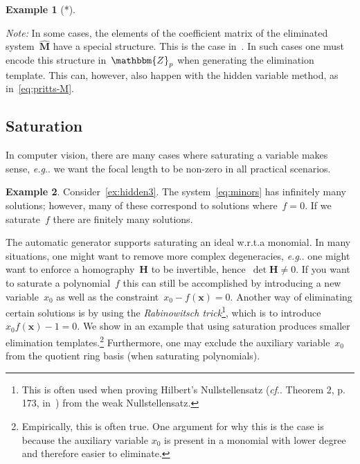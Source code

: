 \documentclass[11pt,a4paper]{article}
\makeatletter
\theoremstyle{definition}
\newtheorem{example}{Example}
\newcommand{\mat}[1]{\bm{#1}}
\newcommand{\Z}{\ensuremath{\mathbbm{Z}}}
\DeclareRobustCommand\eg{\emph{e.g}\@ifnextchar.{}{.\@}}
\DeclareRobustCommand\cf{\emph{cf}\@ifnextchar.{}{.\@}}
\makeatother
\begin{document}
\begin{example}[*]

\end{example}

\emph{Note:} In some cases, the elements of the coefficient matrix of the eliminated system~$\hat{\mat{M}}$ have a special structure.
This is the case in~\cite{kukelova-etal-cvpr-2015,valtonenoernhag-springer-2021}. In such cases
one must encode this structure in~$\Z_p$ when generating the elimination template.
This can, however, also happen with the hidden variable method, as in~\eqref{eq:pritts-M}.

\subsection{Saturation}
In computer vision, there are many cases where saturating a variable makes sense, \eg{}
we want the focal length to be non-zero in all practical scenarios.

\begin{example}
Consider~\cref{ex:hidden3}. The system~\eqref{eq:minors} has infinitely many solutions; however,
many of these correspond to solutions where~$f=0$. If we saturate~$f$ there are finitely many solutions.
\end{example}

The automatic generator supports saturating an ideal w.r.t.\@ a monomial. In many situations, one might
want to remove more complex degeneracies, \eg{} one might want to enforce a homography~$\mat{H}$
to be invertible, hence~$\det{\mat{H}}\neq 0$. If you want to saturate a polynomial~$f$ this
can still be accomplished by introducing a new
variable~$x_0$ as well as the constraint~$x_0-f(\mat{x}) = 0$.
Another way of eliminating certain solutions is by using the \emph{Rabinowitsch trick}\footnote{This
is often used when proving Hilbert's Nullstellensatz (\cf{} Theorem 2, p. 173, in~\cite{cox}) from the weak
Nullstellensatz.},
which is to introduce~$x_0f(\mat{x})-1 = 0$.
We show in an example that using saturation produces smaller elimination
templates.\footnote{Empirically, this is often true. One argument for why this is the case
is because the auxiliary variable $x_0$ is present in a monomial with lower degree and therefore easier to eliminate.}
Furthermore, one may exclude the auxiliary variable~$x_0$ from the quotient ring basis
(when saturating polynomials).
\end{document}
